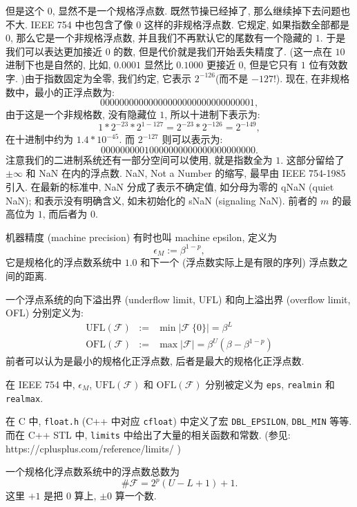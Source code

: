 \documentclass[a4paper]{ctexart}
\begin{document}
{但是这个 $0$, 显然不是一个规格浮点数. 既然节操已经掉了, 那么继续掉下去问题也不大. 
IEEE 754 中也包含了像 $0$ 这样的非规格浮点数. 它规定, 如果指数全部都是 $0$, 
那么它是一个非规格浮点数, 并且我们不再默认它的尾数有一个隐藏的 $1$. 
于是我们可以表达更加接近 $0$ 的数, 但是代价就是我们开始丢失精度了. (这一点在 $10$ 
进制下也是自然的, 比如, $0.0001$ 显然比 $0.1000$ 更接近 $0$, 但是它只有 $1$ 
位有效数字. )由于指数固定为全零, 我们约定, 它表示 $2^{-126}$(而不是 $-127$!). 
现在, 在非规格数中，最小的正浮点数为:
$$
0 00000000 00000000000000000000001,
$$
由于这是一个非规格数, 没有隐藏位 $1$, 
所以十进制下表示为:
$$
1 * 2^{-23} * 2^{1-127} = 2^{-23} * 2^{-126} = 2^{-149},
$$
在十进制中约为 $1.4 * 10^{-45}$.
而 $2^{-127}$ 则可以表示为:
$$
0 00000000 10000000000000000000000.
$$ 
注意我们的二进制系统还有一部分空间可以使用, 就是指数全为 $1$.
这部分留给了$\pm \infty$ 和 NaN 在内的浮点数.
NaN, Not a Number 的缩写, 最早由 IEEE 754-1985 引入. 在最新的标准中,
NaN 分成了表示不确定值, 如分母为零的 qNaN (quiet NaN); 和表示没有明确含义,
如未初始化的 sNaN (signaling NaN). 前者的 $m$ 的最高位为 $1$,
而后者为 $0$.

 机器精度 (machine precision) 有时也叫
machine epsilon, 定义为
$$
\epsilon_M := \beta^{1 - p},
$$
它是规格化的浮点数系统中 $1.0$ 和下一个 (浮点数实际上是有限的序列)
浮点数之间的距离.

 一个浮点系统的向下溢出界 (underflow limit, UFL)
和向上溢出界 (overflow limit, OFL) 分别定义为:
$$
\begin{array}{rcl}
  \mbox{UFL}(\mathscr{F}) &:=& \min \left|\mathscr{F} \ \{0\} \right|
  = \beta^{L} \\
  \mbox{OFL}(\mathscr{F}) &:=& \max \left|\mathscr{F} \right|
  = \beta^{U}\left(\beta - \beta^{1 - p}\right) 
\end{array}
$$
前者可以认为是最小的规格化正浮点数, 后者是最大的规格化正浮点数.  

 在 IEEE 754 中, $\epsilon_M$,
$\mbox{UFL}(\mathscr{F})$ 和 $\mbox{OFL}(\mathscr{F})$ 分别被定义为
\verb|eps|, \verb|realmin| 和 \verb|realmax|.

在 C 中, \verb|float.h| (C++ 中对应 \verb|cfloat|) 中定义了宏
\verb|DBL_EPSILON|, \verb|DBL_MIN| 等等. 而在 C++ STL 中,
\verb|limits| 中给出了大量的相关函数和常数.
(参见:\newline
https://cplusplus.com/reference/limits/
)

 一个规格化浮点数系统中的浮点数总数为
$$
\#\mathscr{F} = 2^p (U - L + 1) + 1.
$$
这里 $+1$ 是把 $0$ 算上, $\pm 0$ 算一个数.

}
\end{document}
